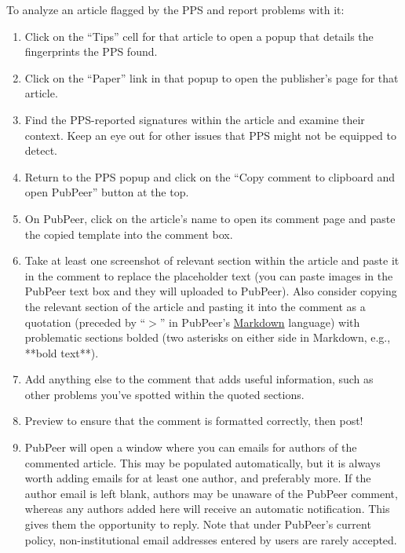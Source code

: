 \documentclass[letterpaper, 12pt]{article}
\begin{document}


To analyze an article flagged by the PPS and report problems with it:

\begin{enumerate}
    \setlength\itemsep{-0.5em}
    \item Click on the ``Tips'' cell for that article to open a popup that details the fingerprints the PPS found.
    \item Click on the ``Paper'' link in that popup to open the publisher's page for that article.
    \item Find the PPS-reported signatures within the article and examine their context. Keep an eye out for other issues that PPS might not be equipped to detect.
    \item Return to the PPS popup and click on the ``Copy comment to clipboard and open PubPeer'' button at the top.
    \item On PubPeer, click on the article's name to open its comment page and paste the copied template into the comment box.
    \item Take at least one screenshot of relevant section within the article and paste it in the comment to replace the placeholder text (you can paste images in the PubPeer text box and they will uploaded to PubPeer). Also consider copying the relevant section of the article and pasting it into the comment as a quotation (preceded by ``$>$'' in PubPeer's \href{https://pubpeer.com/static/markdown}{Markdown} language) with problematic sections bolded (two asterisks on either side in Markdown, e.g., **bold text**).
    \item Add anything else to the comment that adds useful information, such as other problems you've spotted within the quoted sections.
    \item Preview to ensure that the comment is formatted correctly, then post!
    \item PubPeer will open a window where you can emails for authors of the commented article. This may be populated automatically, but it is always worth adding emails for at least one author, and preferably more. If the author email is left blank, authors may be unaware of the PubPeer comment, whereas any authors added here will receive an automatic notification. This gives them the opportunity to reply. Note that under PubPeer's current policy, non-institutional email addresses entered by users are rarely accepted.
\end{enumerate}
\end{document}
